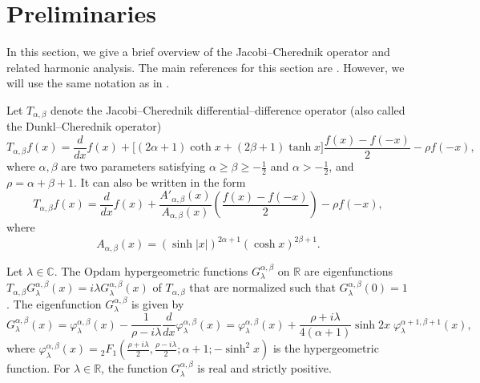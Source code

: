 \documentclass[a4paper,11pt, reqno]{amsart}
\theoremstyle{plain}
\theoremstyle{definition}
\theoremstyle{remark}
\def \R{{\mathbb R}}
\def \C{{\mathbb C}}
\def\R{\mathbb R}
\begin{document}
\section{Preliminaries}\label{sec2}

In this section, we give a brief overview of the Jacobi--Cherednik operator and related harmonic analysis. The main references for this section are \cite{mej14, opd95, opd00, sch08}. However, we will use the same notation as in \cite{por21}.

Let $T_{\alpha, \beta}$ denote the Jacobi--Cherednik differential--difference operator (also called the Dunkl--Cherednik operator)
\[T_{\alpha, \beta} f(x)=\frac{d}{dx} f(x)+ \Big[ 
(2\alpha + 1) \coth x + (2\beta + 1) \tanh x \Big] \frac{f(x)-f(-x)}{2} - \rho f(-x), \]
where $\alpha, \beta$ are two parameters satisfying $\alpha \geq \beta \geq -\frac{1}{2}$ and $\alpha > -\frac{1}{2}$, and $\rho= \alpha + \beta + 1$. 
It can also be written in the form
\[T_{\alpha, \beta} f(x)=\frac{d}{dx} f(x)+ \frac{A'_{\alpha, \beta} (x)}{A_{\alpha, \beta} (x)} \left(  \frac{f(x)-f(-x)}{2} \right) - \rho f(-x), \]
where \[ A_{\alpha, \beta} (x)= (\sinh |x| )^{2 \alpha+1} (\cosh x )^{2 \beta+1}. \] 

Let $\lambda \in \C$. The Opdam hypergeometric functions $G^{\alpha, \beta}_\lambda$ on $\R$ are eigenfunctions $T_{\alpha, \beta} G^{\alpha, \beta}_\lambda(x)=i \lambda  G^{\alpha, \beta}_\lambda(x)$ of $T_{\alpha, \beta}$ that are normalized such that $G^{\alpha, \beta}_\lambda(0)=1$. The eigenfunction $G^{\alpha, \beta}_\lambda$ is given by
\[G^{\alpha, \beta}_\lambda (x)= \varphi^{\alpha, \beta}_\lambda (x) - \frac{1}{\rho - i \lambda} \frac{d}{dx}\varphi^{\alpha, \beta}_\lambda (x)=\varphi^{\alpha, \beta}_\lambda (x)+ \frac{\rho+i \lambda}{4(\alpha+1)} \sinh 2x \; \varphi^{\alpha+1, \beta+1}_\lambda (x),  \]
where $\varphi^{\alpha, \beta}_\lambda (x)={}_2F_1 \left(\frac{\rho+i \lambda}{2}, \frac{\rho-i \lambda}{2} ; \alpha+1; -\sinh^2 x \right) $ is the hypergeometric function. For $\lambda \in \R$, the function $G^{\alpha, \beta}_\lambda$ is real and strictly positive.
\end{document}
